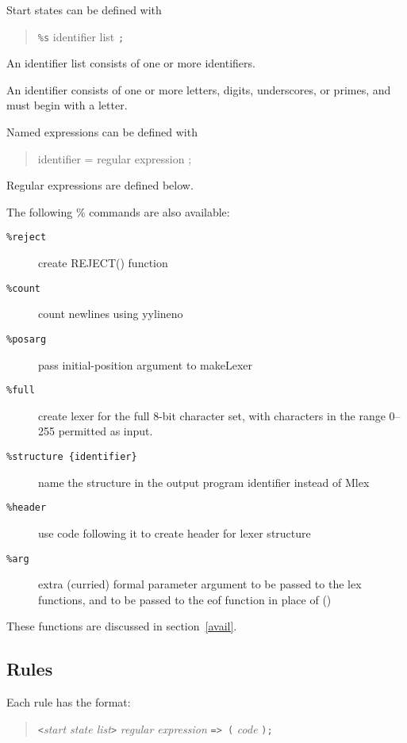 Start states can be defined with
\begin{quote}
\verb|%s| {identifier list} \verb|;|
\end{quote}

An identifier list consists of one or more identifiers.

An identifier consists of one or more letters, digits, underscores,
or primes, and must begin with a letter.

Named expressions can be defined with

\begin{quote}
        {identifier} = {regular expression} ;
\end{quote}

Regular expressions are defined below.

The following \% commands are also available:

\begin{description}
\item[\tt \%reject]     create REJECT() function
\item[\tt \%count]      count newlines using yylineno
\item[\tt \%posarg]     pass initial-position argument to makeLexer
\item[\tt \%full]       create lexer for the full 8-bit character set,
                          with characters in the range 0--255 permitted
                          as input.
\item[\tt \%structure \{identifier\}]  name the structure in the output program
                          {identifier} instead of Mlex
\item[\tt \%header]         use code following it to create header for lexer
                          structure
\item[\tt \%arg]       extra (curried) formal parameter argument to be
                          passed to the lex functions, and to be passed
                          to the eof function in place of ()
\end{description}
        These functions are discussed in section~\ref{avail}.

\subsection{Rules}

Each rule has the format:

\begin{quote}
       \verb|<|{\it start state list}\verb|>| {\it regular expression} \verb|=> (| {\it code} \verb|);|
\end{quote}

